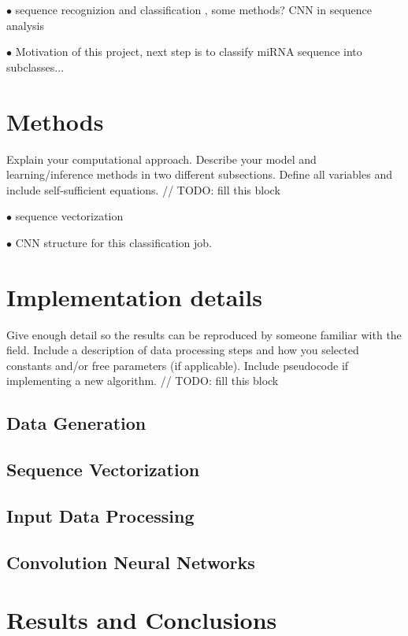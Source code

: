 \documentclass[letterpaper, 11pt]{article}
\begin{document}
\begin{multicols*}{2}
{$\bullet$ sequence recognizion and classification , some methods? CNN in sequence analysis

$\bullet$ Motivation of this project, next step is to classify miRNA sequence into subclasses...

}
\section{Methods}
{
Explain your computational approach. Describe your model and learning/inference methods in two different subsections. Define all variables and include self-sufficient equations.
\newline 
// TODO: fill this block

$\bullet$ sequence vectorization

$\bullet$ CNN structure for this classification job.

}

\section{Implementation details}
{
Give enough detail so the results can be reproduced by someone familiar with the field. Include a description of data processing steps and how you selected constants and/or free parameters (if applicable). Include pseudocode if implementing a new algorithm.
\newline
// TODO: fill this block
\subsection{Data Generation}

\subsection{Sequence Vectorization}

\subsection{Input Data Processing}

\subsection{Convolution Neural Networks}

}

\section{Results and Conclusions}


\end{multicols*}
\end{document}

